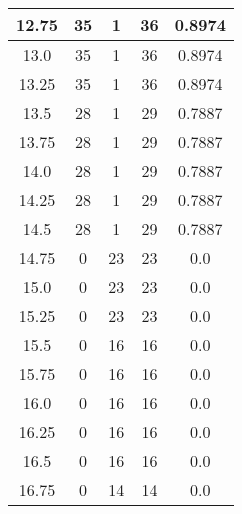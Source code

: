 \documentclass[letterpaper, 12pt]{article}
\begin{document}
\begin{longtable}{|c|c|c|c|c|}
\hline
12.75 & 35 & 1 & 36 & 0.8974 \\
\hline
13.0 & 35 & 1 & 36 & 0.8974 \\
\hline
13.25 & 35 & 1 & 36 & 0.8974 \\
\hline
13.5 & 28 & 1 & 29 & 0.7887 \\
\hline
13.75 & 28 & 1 & 29 & 0.7887 \\
\hline
14.0 & 28 & 1 & 29 & 0.7887 \\
\hline
14.25 & 28 & 1 & 29 & 0.7887 \\
\hline
14.5 & 28 & 1 & 29 & 0.7887 \\
\hline
14.75 & 0 & 23 & 23 & 0.0 \\
\hline
15.0 & 0 & 23 & 23 & 0.0 \\
\hline
15.25 & 0 & 23 & 23 & 0.0 \\
\hline
15.5 & 0 & 16 & 16 & 0.0 \\
\hline
15.75 & 0 & 16 & 16 & 0.0 \\
\hline
16.0 & 0 & 16 & 16 & 0.0 \\
\hline
16.25 & 0 & 16 & 16 & 0.0 \\
\hline
16.5 & 0 & 16 & 16 & 0.0 \\
\hline
16.75 & 0 & 14 & 14 & 0.0 \\
\hline
\end{longtable}
\end{document}
